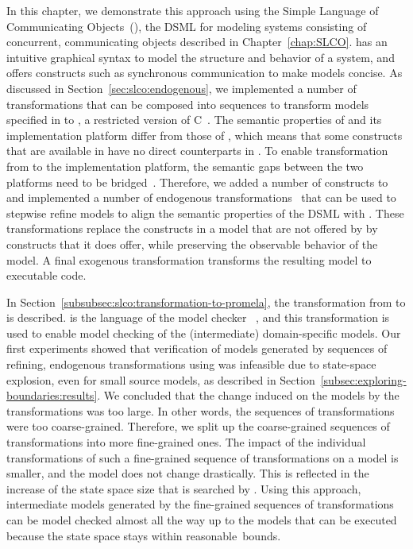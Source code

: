 In this chapter, we demonstrate this approach using the Simple Language of Communicating Objects~(\SLCO), the DSML for modeling systems consisting of concurrent, communicating objects described in Chapter~\ref{chap:SLCO}.
\SLCO has an intuitive graphical syntax to model the structure and behavior of a system, and offers constructs such as synchronous communication to make models concise.
As discussed in Section~\ref{sec:slco:endogenous}, we implemented a number of transformations that can be composed into sequences to transform models specified in \SLCO to \NQC, a restricted version of C~\cite{Baum2003}.
The semantic properties of \NQC and its implementation platform differ from those of \SLCO, which means that some constructs that are available in \SLCO have no direct counterparts in \NQC.
To enable transformation from \SLCO to the implementation platform, the semantic gaps between the two platforms need to be bridged~\cite{Amstel2008}.
Therefore, we added a number of constructs to \SLCO and implemented a number of endogenous transformations~\cite{Mens:2006:TMT:1706639.1706924} that can be used to stepwise refine models to align the semantic properties of the DSML with \NQC.
These transformations replace the constructs in a model that are not offered by \NQC by constructs that it does offer, while preserving the observable behavior of the model.
A final exogenous transformation transforms the resulting model to executable code.

In Section~\ref{subsubsec:slco:transformation-to-promela}, the transformation from \SLCO to \Promela is described.
\Promela is the language of the model checker \Spin~\cite{Holzmann2003}, and this transformation is used to enable model checking of the (intermediate) domain-specific models.
Our first experiments showed that verification of models generated by sequences of refining, endogenous transformations using \Spin was infeasible due to state-space explosion, even for small source models, as described in Section~\ref{subsec:exploring-boundaries:results}.
We concluded that the change induced on the models by the transformations was too large.
In other words, the sequences of transformations were too coarse-grained.
Therefore, we split up the coarse-grained sequences of transformations into more fine-grained ones.
The impact of the individual transformations of such a fine-grained sequence of transformations on a model is smaller, and the model does not change drastically.
This is reflected in the increase of the state space size that is searched by \Spin.
Using this approach, intermediate models generated by the fine-grained sequences of transformations can be model checked almost all the way up to the models that can be executed because the state space stays within reasonable~bounds.


